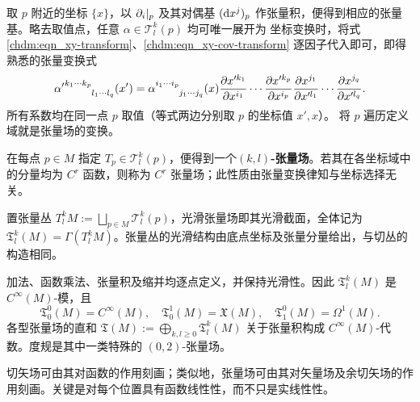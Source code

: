 取 $p$ 附近的坐标 $\{x\}$，以 $\partial_i|_p$ 及其对偶基 $(\dd x^j)_p$ 作张量积，便得到相应的张量基。略去取值点，任意 $\alpha\in\mathcal T^k_l(p)$ 均可唯一展开为
坐标变换时，将式 \eqref{chdm:eqn_xy-transform}、\eqref{chdm:eqn_xy-cov-transform} 逐因子代入即可，即得熟悉的张量变换式
\[
    {\alpha'}^{k_1 \cdots k_p}_{\phantom{k_1 \cdots k_p}l_1\cdots l_q} (x')
    ={\alpha}^{i_1 \cdots i_p}_{\phantom{i_1 \cdots i_p}j_1\cdots j_q} (x) 
    \pdv{x'^{k_1}}{x^{i_1}} \cdots
    \pdv{x'^{k_p}}{x^{i_p}}
    \pdv{x^{j_1}}{x'^{l_1}} \cdots
    \pdv{x^{j_q}}{x'^{l_q}}.
\]
所有系数均在同一点 $p$ 取值（等式两边分别取 $p$ 的坐标值 $x',x$）。
将 $p$ 遍历定义域就是张量场的变换。

\begin{definition}
    在每点 $p\in M$ 指定 $T_p\in\mathcal T^k_l(p)$，便得到一个\textbf{$(k,l)$-张量场}。若其在各坐标域中的分量均为 $C^r$ 函数，则称为 $C^r$ 张量场；此性质由张量变换律知与坐标选择无关。

    置张量丛 $T^k_lM:=\bigsqcup_{p\in M}\mathcal T^k_l(p)$，光滑张量场即其光滑截面，全体记为 $\mathfrak T^k_l(M)=\Gamma(T^k_lM)$。张量丛的光滑结构由底点坐标及张量分量给出，与切丛的构造相同。
\end{definition}

加法、函数乘法、张量积及缩并均逐点定义，并保持光滑性。因此 $\mathfrak T^k_l(M)$ 是 $C^\infty(M)$-模，且
\[
    \mathfrak T^0_0(M)=C^\infty(M),\quad
    \mathfrak T^1_0(M)=\mathfrak X(M),\quad
    \mathfrak T^0_1(M)=\Omega^1(M).
\]
各型张量场的直和 $\mathfrak T(M):=\bigoplus_{k,l\geqslant0}\mathfrak T^k_l(M)$ 关于张量积构成 $C^\infty(M)$-代数。度规是其中一类特殊的 $(0,2)$-张量场。

切矢场可由其对函数的作用刻画；类似地，张量场可由其对矢量场及余切矢场的作用刻画。关键是对每个位置具有函数线性性，而不只是实线性性。

